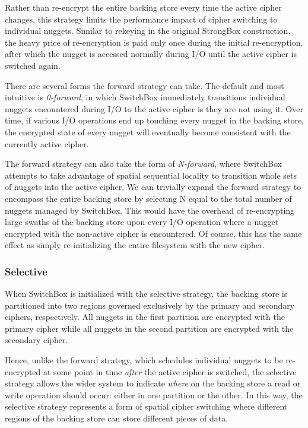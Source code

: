 Rather than re-encrypt the entire backing store every time the active cipher
changes, this strategy limits the performance impact of cipher switching to
individual nuggets. Similar to rekeying in the original StrongBox construction,
the heavy price of re-encryption is paid only once during the initial
re-encryption, after which the nugget is accessed normally during I/O until the
active cipher is switched again.

There are several forms the forward strategy can take. The default and most
intuitive is \emph{0-forward}, in which SwitchBox immediately transitions
individual nuggets encountered during I/O to the active cipher is they are not
using it. Over time, if various I/O operations end up touching every nugget in
the backing store, the encrypted state of every nugget will eventually become
consistent with the currently active cipher.

The forward strategy can also take the form of \emph{N-forward}, where SwitchBox
attempts to take advantage of spatial sequential locality to transition whole
sets of nuggets into the active cipher. We can trivially expand the forward
strategy to encompass the entire backing store by selecting N equal to the total
number of nuggets managed by SwitchBox. This would have the overhead of
re-encrypting large swaths of the backing store upon every I/O operation where a
nugget encrypted with the non-active cipher is encountered. Of course, this has
the same effect as simply re-initializing the entire filesystem with the new
cipher.

\subsubsection{Selective}

When SwitchBox is initialized with the selective strategy, the backing store is
partitioned into two regions governed exclusively by the primary and secondary
ciphers, respectively. All nuggets in the first partition are encrypted with the
primary cipher while all nuggets in the second partition are encrypted with the
secondary cipher.

Hence, unlike the forward strategy, which schedules individual nuggets to be
re-encrypted at some point in time \emph{after} the active cipher is switched,
the selective strategy allows the wider system to indicate \emph{where} on the
backing store a read or write operation should occur: either in one partition or
the other. In this way, the selective strategy represents a form of spatial
cipher switching where different regions of the backing store can store
different pieces of data.

